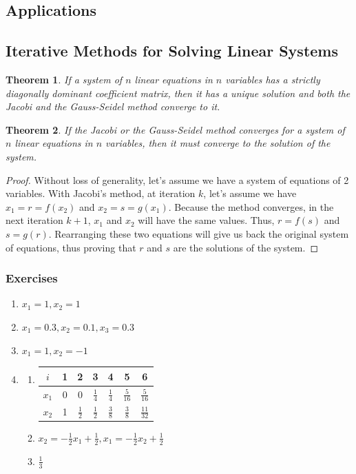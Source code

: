 \documentclass{article}
\newtheorem*{theorem*}{Theorem}
\begin{document}
\subsection{Applications}
\subsection{Iterative Methods for Solving Linear Systems}
\begin{theorem*}
  If a system of $n$ linear equations in $n$ variables has a strictly diagonally dominant
  coefficient matrix, then it has a unique solution and both the Jacobi and the Gauss-Seidel method
  converge to it.
\end{theorem*}
\begin{theorem*}
  If the Jacobi or the Gauss-Seidel method converges for a system of $n$ linear equations in $n$
  variables, then it must converge to the solution of the system.
\end{theorem*}
\begin{proof}
  Without loss of generality, let's assume we have a system of equations of 2 variables. With
  Jacobi's method, at iteration $k$, let's assume we have $x_1=r=f(x_2)$ and $x_2=s=g(x_1)$. Because
  the method converges, in the next iteration $k+1$, $x_1$ and $x_2$ will have the same values.
  Thus, $r=f(s)$ and $s=g(r)$. Rearranging these two equations will give us back the original system
  of equations, thus proving that $r$ and $s$ are the solutions of the system.
\end{proof}
\subsubsection*{Exercises}
\begin{enumerate}
  \item $x_1=1, x_2=1$
    \setcounter{enumi}{10}
  \item $x_1=0.3,x_2=0.1,x_3=0.3$
    \setcounter{enumi}{16}
  \item $x_1=1,x_2=-1$
    \setcounter{enumi}{26}
  \item
    \begin{enumerate}
      \item
        {
          \renewcommand{\arraystretch}{2}
          \begin{tabular}{c|cccccc}
            \toprule
            $i$ & 1 & 2 & 3 & 4 & 5 & 6 \\
            \midrule
            $x_1$ & 0 & 0 & $\frac{1}{4}$ & $\frac{1}{4}$ & $\frac{5}{16}$ & $\frac{5}{16}$ \\
            $x_2$ & 1 & $\frac{1}{2}$ & $\frac{1}{2}$ & $\frac{3}{8}$ & $\frac{3}{8}$ & $\frac{11}{32}$ \\
            \bottomrule
          \end{tabular}
        }
      \item $x_2=-\frac{1}{2}x_1+\frac{1}{2}, x_1=-\frac{1}{2}x_2+\frac{1}{2}$
        \setcounter{enumii}{3}
      \item $\frac{1}{3}$
    \end{enumerate}
\end{enumerate}
\end{document}
